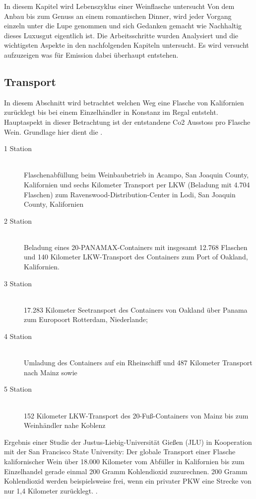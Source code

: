 In diesem Kapitel wird Lebenszyklus einer Weinflasche untersucht Von dem Anbau bis zum Genuss an einem romantischen Dinner, wird jeder Vorgang einzeln unter die Lupe genommen und sich Gedanken gemacht wie Nachhaltig dieses Luxusgut eigentlich ist. Die Arbeitsschritte wurden Analysiert und die wichtigsten Aspekte in den nachfolgenden Kapiteln untersucht. Es wird versucht aufzuzeigen was für Emission dabei überhaupt entstehen.
\subsection{Transport}
In diesem Abschnitt wird betrachtet welchen Weg eine Flasche von Kalifornien zurücklegt bis bei einem Einzelhändler in Konstanz im Regal entsteht. Hauptaspekt in dieser Betrachtung ist der entstandene Co2 Ausstoss pro Flasche Wein. Grundlage hier dient die \cite{_kohlendioxid-bilanz}. 
\begin{description}
	\item[1 Station]\hfill \\
	Flaschenabfüllung beim Weinbaubetrieb in Acampo, San Joaquin County, 			Kalifornien und sechs Kilometer Transport per LKW (Beladung mit 4.704 			Flaschen) zum Ravenswood-Distribution-Center in Lodi, San Joaquin 				County, Kalifornien
	\item[2 Station]\hfill \\
	Beladung eines 20-PANAMAX-Containers mit insgesamt 12.768 Flaschen 			und 140 Kilometer LKW-Transport des Containers zum Port of Oakland, 			Kalifornien.
	\item[3 Station]\hfill \\
		17.283 Kilometer Seetransport des Containers von Oakland über Panama 			zum Europoort Rotterdam, Niederlande;
	\item[4 Station]\hfill \\
		Umladung des Containers auf ein Rheinschiff und 487 Kilometer Transport 			nach Mainz sowie	
	\item[5 Station]\hfill \\ 
	152 Kilometer LKW-Transport des 20-Fuß-Containers von Mainz bis zum 			Weinhändler nahe Koblenz
\end{description}

Ergebnis einer Studie der Justus-Liebig-Universität Gießen (JLU) in Kooperation mit der San Francisco State University: Der globale Transport einer Flasche kalifornischer Wein über 18.000 Kilometer vom Abfüller in Kalifornien bis zum Einzelhandel gerade einmal 200 Gramm Kohlendioxid zuzurechnen. 200 Gramm Kohlendioxid werden beispielsweise frei, wenn ein privater PKW eine Strecke von nur 1,4 Kilometer zurücklegt.   \cite{_kohlendioxid-bilanz}. 


